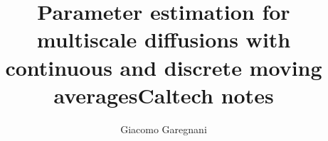 \newcommand{\email}[1]{\href{#1}{#1}}
\newcommand{\TheTitle}{Parameter estimation for multiscale diffusions with continuous and discrete moving averages} 
\newcommand{\TheAuthors}{A. Abdulle, G. Garegnani, G. Pavliotis, A. M. Stuart}
\title{{\TheTitle}}
\newcommand*\samethanks[1][\value{footnote}]{\footnotemark[#1]}
\title{Caltech notes}
\author{Giacomo Garegnani}
\date{}

\usepackage{amsopn}
\DeclareMathOperator{\diag}{diag}
\DeclarePairedDelimiter{\ceil}{\left\lceil}{\right\rceil}
\DeclarePairedDelimiter{\floor}{\lfloor}{\rfloor}
\newcommand{\abs}[1]{\left\lvert#1\right\rvert}
\newcommand{\norm}[1]{\left\|#1\right\|}
\renewcommand{\phi}{\varphi}
\renewcommand{\theta}{\vartheta}
\renewcommand{\Pr}{\mathbb{P}}
\newcommand{\btilde}{\widetilde}
\newcommand{\bhat}{\widehat}
\newcommand{\eqtext}[1]{\ensuremath{\stackrel{#1}{=}}}
\newcommand{\leqtext}[1]{\ensuremath{\stackrel{#1}{\leq}}}
\newcommand{\iid}{\ensuremath{\stackrel{\text{i.i.d.}}{\sim}}}
\newcommand{\totext}[1]{\ensuremath{\stackrel{#1}{\to}}}
\newcommand{\rightarrowtext}[1]{\ensuremath{\stackrel{#1}{\longrightarrow}}}
\newcommand{\leftrightarrowtext}[1]{\ensuremath{\stackrel{#1}{\longleftrightarrow}}}
\newcommand{\pdv}[2]{\ensuremath\partial_{#2}#1}
\newcommand{\N}{\mathbb{N}}
\newcommand{\R}{\mathbb{R}}
\newcommand{\C}{\mathbb{C}}
\newcommand{\OO}{\mathcal{O}}
\newcommand{\epl}{\varepsilon}
\newcommand{\diffL}{\mathcal{L}}
\newcommand{\defeq}{\coloneqq}
\newcommand{\eqdef}{\eqqcolon}
\newcommand{\Var}{\operatorname{Var}}
\newcommand{\E}{\operatorname{\mathbb{E}}}
\newcommand{\MSE}{\operatorname{MSE}}
\newcommand{\trace}{\operatorname{tr}}
\newcommand{\MH}{\mathrm{MH}}
\newcommand{\ttt}{\texttt}
\newcommand{\Hell}{d_{\mathrm{Hell}}}
\newcommand{\sksum}{{\textstyle\sum}}
\renewcommand{\d}{\mathrm{d}}
\newcommand{\dd}{\,\mathrm{d}}
\newcommand{\corr}[1]{{\color{red}#1}}
\newcommand{\Tau}{\tau}
\newcommand{\LL}{L}
\newcommand{\HH}{H}
\newcommand{\WW}{W}
\newcommand{\mbf}{\mathbf}
\newcommand{\bfs}{\boldsymbol}
\newcommand{\todo}{{\color{red} TO DO}}
\newcommand{\X}{\mathbb{X}}
\newcommand{\nablar}{\nabla_{\hat x}}
\newcommand{\eval}[1]{\bigr\rvert_{#1}}
\newcommand{\normm}[1]{\norm{#1}_a}
\newcommand{\gausspdf}[3]{\exp\left\{-\frac{(#1 - #2)^2}{#3}\right\}}

